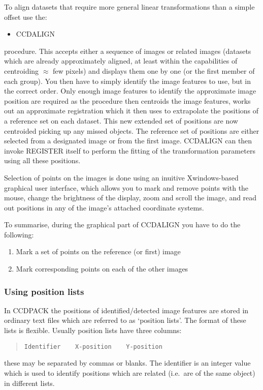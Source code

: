\documentclass[twoside,11pt]{article}
\newcommand{\htmlref}[2]{#1}
\newcommand{\latexhtml}[2]{#1}
\newcommand{\xlabel}[1]{}
\renewcommand{\_}{\texttt{\symbol{95}}}
\newcommand{\ttsize}{\latexhtml{\small}{}}
\newenvironment{myquote}{\begin{quote}\ttsize}{\end{quote}}
\newcommand{\routine}[1]{{\sc #1}}
\newcommand{\xroutine}[1]{\htmlref{{\sc #1}}{#1}}
\begin{document}
To align datasets that require more general linear transformations
than a simple offset
use the:
\begin{itemize}
\item \xroutine{CCDALIGN}
\end{itemize}
procedure. This accepts either a sequence of images or related images
(datasets which are already approximately aligned, at least within the
capabilities of centroiding $\approx$ few pixels) and displays them one
by one (or the first member of each group). You then have to simply
identify the image features to use, but in the correct order. Only
enough image features to identify the approximate image position are
required as the  procedure then centroids the image features, works out
an approximate registration which it then uses to extrapolate the
positions of a reference set on each dataset. This new extended set of
positions are now centroided picking up any missed objects. The
reference set of positions are either selected from a designated image or
from the first image.
\routine{CCDALIGN} can then invoke \routine{REGISTER} itself to
perform the fitting of the transformation parameters using all these
positions.

Selection of points on the images is done using an inuitive Xwindows-based
graphical user interface, which allows you to mark and remove 
points with the mouse, change the brightness of the display,
zoom and scroll the image, and read out positions in any
of the image's attached coordinate systems.

To summarise, during the graphical part of \routine{CCDALIGN} 
you have to do the following:
\begin{enumerate}
\item Mark a set of points on the reference (or first) image
\item Mark corresponding points on each of the other images
\end{enumerate}



\subsubsection{\xlabel{usinglistsofpositions}Using position lists
               \label{using_position_lists}}

In CCDPACK the positions of identified/detected image features are
stored in ordinary text files which are referred to as `position lists'.
The format of these lists is flexible. Usually position lists have three
columns:
\begin{myquote}
\begin{verbatim}
Identifier    X-position    Y-position
\end{verbatim}
\end{myquote}
these may be separated by commas or blanks. The identifier is an
integer value which is used to identify positions which are related
(i.e.\ are of the same object) in different lists.
\end{document}
